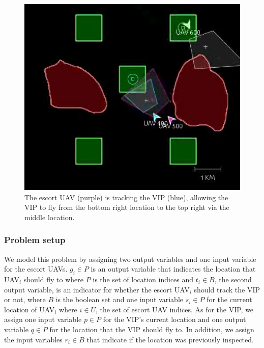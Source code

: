 \documentclass[]{article}
\begin{document}
\begin{figure}[htp]
    \centering
\includegraphics[scale=.4]{figs/vip.png}
    \caption{The escort UAV (purple) is tracking the VIP (blue), allowing the VIP
to fly from the bottom right location to the top right via the middle location.}
    \label{fig:vip}
\end{figure}


\subsubsection{Problem setup}\label{problem-setup}

We model this problem by assigning two output variables and one input variable
for the escort UAVs. $g_{i} \in P$ is an output variable that indicates the location that UAV$_{i}$ 
should fly to where $P$ is the set of location indices and $t_{i}\in B$, the second output 
variable, is an indicator for whether the escort UAV$_{i}$ should track the VIP or not, 
where $B$ is the boolean set and one input variable $s_{i} \in P$ for the current location 
of UAV$_{i}$ where $i \in U$, the set of escort UAV indices. As for the VIP, we assign 
one input variable $p \in P$ for the VIP's current location and one output variable 
$q \in P$ for the location that the VIP should fly to. In addition, we assign the
input variables $r_{i} \in B$ that indicate if the location was previously 
inspected.
\end{document}
